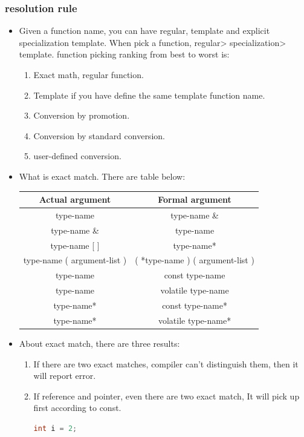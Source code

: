 \documentclass[a4paper,11pt,twoside]{book}
\newcommand{\tophline}{\hline }
\newcommand{\bottomhline}{\\ \hline }
\newcommand{\tophline}{ }
\newcommand{\bottomhline}{ }
\begin{document}
\subsubsection{resolution rule}
\begin{itemize}
	\item Given a function name, you can have regular, template and explicit specialization template. When pick a function, regular> specialization> template. function picking ranking from best to worst is:
	\begin{enumerate}
		\item Exact math, regular function.
		\item Template if you have define the same template function name.
		\item Conversion by promotion.
		\item Conversion by standard conversion.
		\item user-defined conversion.
	\end{enumerate}

\item What is exact match. There are table below:

\begin{center}
	\begin{tabular}{|c|c|}
	\tophline
	Actual argument & Formal argument \\
	\tophline
	type-name & type-name \& \\
	\tophline
	type-name \& & type-name \\ \tophline
	type-name [ ] &  type-name* \\ \tophline
	type-name ( argument-list ) & ( *type-name ) ( argument-list ) \\ \tophline
	type-name  & const type-name \\ \tophline
	type-name  &  volatile  type-name \\ \tophline
	type-name*  & const type-name*  \\ \tophline
	type-name*  & volatile  type-name*  \bottomhline
	\end{tabular}
\end{center}

	\item About exact match, there are three results:
	\begin{enumerate}
		\item If there are two exact matches, compiler can't distinguish them, then it will report error.
		
		\item If reference and pointer, even there are two exact match, It will pick up first according to const.
\begin{lstlisting}[frame=single, language=c++]
int i = 2;


\end{lstlisting}
\end{enumerate}
\end{itemize}
\end{document}
